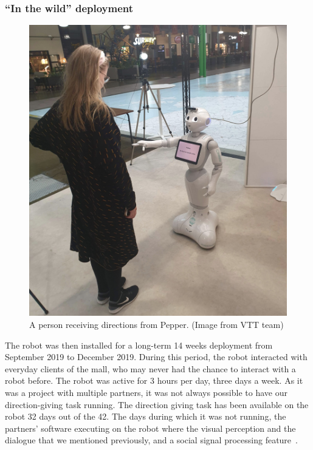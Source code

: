 \documentclass[a4paper,11pt,twoside]{StyleThese}
\begin{document}
\subsubsection{``In the wild'' deployment}\label{subsec:deploy}
\begin{figure}
	\centering
	\includegraphics[width=\linewidth]{figures/chapter3/guided_person.jpg}
	\caption{A person receiving directions from Pepper. (Image from VTT team)}
	\label{fig:guided_person}
\end{figure}
The robot was then installed for a long-term 14 weeks deployment from September 2019 to December 2019. During this period, the robot interacted with everyday clients of the mall, who may never had the chance to interact with a robot before. The robot was active for 3 hours per day, three days a week. As it was a project with multiple partners, it was not always possible to have our direction-giving task running. The direction giving task has been available on the robot 32 days out of the 42. The days during which it was not running, the partners' software executing on the robot where the visual perception and the dialogue that we mentioned previously, and a social signal processing feature~\cite{foster2019mummer}.
\end{document}

